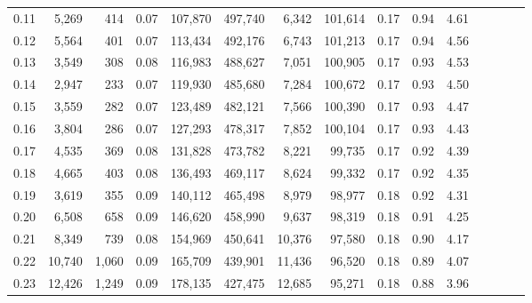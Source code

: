 \begin{tabular}{rrrcrrrrrrrrrrr}
0.11 &   5,269 &    414 &                                       0.07 &  107,870 &  497,740 &    6,342 &  101,614 &  0.17 &  0.94 &                         4.61 \\
0.12 &   5,564 &    401 &                                       0.07 &  113,434 &  492,176 &    6,743 &  101,213 &  0.17 &  0.94 &                         4.56 \\
0.13 &   3,549 &    308 &                                       0.08 &  116,983 &  488,627 &    7,051 &  100,905 &  0.17 &  0.93 &                         4.53 \\
0.14 &   2,947 &    233 &                                       0.07 &  119,930 &  485,680 &    7,284 &  100,672 &  0.17 &  0.93 &                         4.50 \\
0.15 &   3,559 &    282 &                                       0.07 &  123,489 &  482,121 &    7,566 &  100,390 &  0.17 &  0.93 &                         4.47 \\
0.16 &   3,804 &    286 &                                       0.07 &  127,293 &  478,317 &    7,852 &  100,104 &  0.17 &  0.93 &                         4.43 \\
0.17 &   4,535 &    369 &                                       0.08 &  131,828 &  473,782 &    8,221 &   99,735 &  0.17 &  0.92 &                         4.39 \\
0.18 &   4,665 &    403 &                                       0.08 &  136,493 &  469,117 &    8,624 &   99,332 &  0.17 &  0.92 &                         4.35 \\
0.19 &   3,619 &    355 &                                       0.09 &  140,112 &  465,498 &    8,979 &   98,977 &  0.18 &  0.92 &                         4.31 \\
0.20 &   6,508 &    658 &                                       0.09 &  146,620 &  458,990 &    9,637 &   98,319 &  0.18 &  0.91 &                         4.25 \\
0.21 &   8,349 &    739 &                                       0.08 &  154,969 &  450,641 &   10,376 &   97,580 &  0.18 &  0.90 &                         4.17 \\
0.22 &  10,740 &  1,060 &                                       0.09 &  165,709 &  439,901 &   11,436 &   96,520 &  0.18 &  0.89 &                         4.07 \\
0.23 &  12,426 &  1,249 &                                       0.09 &  178,135 &  427,475 &   12,685 &   95,271 &  0.18 &  0.88 &                         3.96 \\

\end{tabular}
